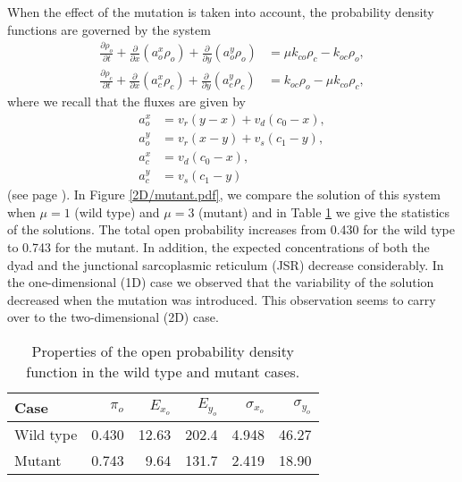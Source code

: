When the effect of the mutation is taken into account, the probability density functions are governed by the system 
\begin{align}
\frac{\partial\rho_{o}}{\partial t}+\frac{\partial}{\partial x}\left(
a_{o}^{x}\rho_{o}\right)  +\frac{\partial}{\partial y}\left(  a_{o}^{y}%
\rho_{o}\right)   &  =\mu k_{co}\rho_{c}-k_{oc}\rho_{o},\label{eq:pdf211}\\
\frac{\partial\rho_{c}}{\partial t}+\frac{\partial}{\partial x}\left(
a_{c}^{x}\rho_{c}\right)  +\frac{\partial}{\partial y}\left(  a_{c}^{y}%
\rho_{c}\right)   &  =k_{oc}\rho_{o}-\mu k_{co}\rho_{c},\label{eq:pdf212}%
\end{align}
where we recall that the fluxes are given by
\begin{align}
a_{o}^{x} &  =v_{r}\left(  y-x\right)  +v_{d}\left(  c_{0}-x\right)
,\nonumber\\
a_{o}^{y} &  =v_{r}\left(  x-y\right)  +v_{s}\left(  c_{1}-y\right)
,\label{eq:fluxes2D}\\
a_{c}^{x} &  =v_{d}\left(  c_{0}-x\right)  ,\nonumber\\
a_{c}^{y} &  =v_{s}\left(  c_{1}-y\right) \nonumber
\end{align}
(see page \pageref{eq:pdf21}).
In Figure \ref{2D/mutant.pdf}, we compare the solution of this system when $\mu=1$ (wild type)
and $\mu=3$ (mutant) and in Table \ref{tab:wtmt_tab_2D} we give the statistics of the solutions. The total 
open probability increases from 0.430 for the wild type to 0.743 for the mutant. In addition, the expected concentrations
of both the dyad and the junctional sarcoplasmic reticulum (JSR) decrease considerably. In the one-dimensional (1D) case we observed that the variability of the solution decreased when the mutation was introduced. This observation seems to carry over to the two-dimensional (2D) case.



\begin{table}  \begin{center}
\begin{tabular}
[c]{|l|r|r|r|r|r|}\hline
Case & $\pi_o$ & $E_{x_o}$ &
 $E_{y_o}$ & $\sigma_{x_o}$ & $\sigma_{y_o}$ \\[1mm]\hline\hline
Wild type & 0.430 & 12.63 & 202.4 &4.948  & 46.27  \\\hline
Mutant & 0.743 & 9.64 & 131.7 & 2.419 &  18.90  \\ \hline
\end{tabular}
 \end{center}
\caption{Properties of the open probability density function in the
wild type and mutant cases. \label{tab:wtmt_tab_2D}}
\end{table}



